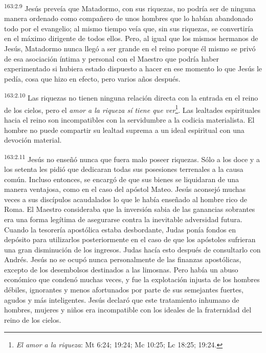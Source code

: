 \par
\textsuperscript{163:2.9} Jesús preveía que Matadormo, con sus riquezas, no podría ser de ninguna manera ordenado como compañero de unos hombres que lo habían abandonado todo por el evangelio; al mismo tiempo veía que, sin sus riquezas, se convertiría en el máximo dirigente de todos ellos. Pero, al igual que los mismos hermanos de Jesús, Matadormo nunca llegó a ser grande en el reino porque él mismo se privó de esa asociación íntima y personal con el Maestro que podría haber experimentado si hubiera estado dispuesto a hacer en ese momento lo que Jesús le pedía, cosa que hizo en efecto, pero varios años después.

\par
\textsuperscript{163:2.10} Las riquezas no tienen ninguna relación directa con la entrada en el reino de los cielos, pero el \textit{amor a la riqueza sí tiene que ver}\footnote{\textit{El amor a la riqueza}: Mt 6:24; 19:24; Mc 10:25; Lc 18:25; 19:24.}. Las lealtades espirituales hacia el reino son incompatibles con la servidumbre a la codicia materialista. El hombre no puede compartir su lealtad suprema a un ideal espiritual con una devoción material.

\par
\textsuperscript{163:2.11} Jesús no enseñó nunca que fuera malo poseer riquezas. Sólo a los doce y a los setenta les pidió que dedicaran todas sus posesiones terrenales a la causa común. Incluso entonces, se encargó de que sus bienes se liquidaran de una manera ventajosa, como en el caso del apóstol Mateo. Jesús aconsejó muchas veces a sus discípulos acaudalados lo que le había enseñado al hombre rico de Roma. El Maestro consideraba que la inversión sabia de las ganancias sobrantes era una forma legítima de asegurarse contra la inevitable adversidad futura. Cuando la tesorería apostólica estaba desbordante, Judas ponía fondos en depósito para utilizarlos posteriormente en el caso de que los apóstoles sufrieran una gran disminución de los ingresos. Judas hacía esto después de consultarlo con Andrés. Jesús no se ocupó nunca personalmente de las finanzas apostólicas, excepto de los desembolsos destinados a las limosnas. Pero había un abuso económico que condenó muchas veces, y fue la explotación injusta de los hombres débiles, ignorantes y menos afortunados por parte de sus semejantes fuertes, agudos y más inteligentes. Jesús declaró que este tratamiento inhumano de hombres, mujeres y niños era incompatible con los ideales de la fraternidad del reino de los cielos.

